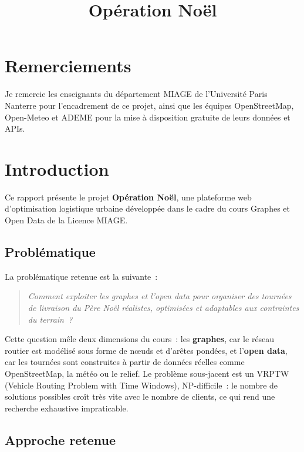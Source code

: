\documentclass[a4paper, 12pt, twoside]{article}
\title{Op\'{e}ration No\"{e}l}
\begin{document}
\pagedegarde

\section*{Remerciements}
Je remercie les enseignants du d\'{e}partement MIAGE de l'Universit\'{e} Paris Nanterre pour
l'encadrement de ce projet, ainsi que les \'{e}quipes OpenStreetMap, Open-Meteo et ADEME pour la
mise \`{a} disposition gratuite de leurs donn\'{e}es et APIs.

\newpage
\tableofcontents
\newpage

\section{Introduction}

Ce rapport pr\'{e}sente le projet \textbf{Op\'{e}ration No\"{e}l}, une plateforme web d'optimisation
logistique urbaine d\'{e}velopp\'{e}e dans le cadre du cours Graphes et Open Data de la Licence MIAGE.

\subsection{Probl\'{e}matique}

La probl\'{e}matique retenue est la suivante~:
\begin{quote}
\emph{Comment exploiter les graphes et l'open data pour organiser des tourn\'{e}es de livraison
du P\`{e}re No\"{e}l r\'{e}alistes, optimis\'{e}es et adaptables aux contraintes du terrain~?}
\end{quote}

Cette question m\^{e}le deux dimensions du cours~: les \textbf{graphes}, car le r\'{e}seau routier
est mod\'{e}lis\'{e} sous forme de n\oe uds et d'ar\^{e}tes pond\'{e}es, et l'\textbf{open data},
car les tourn\'{e}es sont construites \`{a} partir de donn\'{e}es r\'{e}elles comme OpenStreetMap,
la m\'{e}t\'{e}o ou le relief. Le probl\`{e}me sous-jacent est un VRPTW (Vehicle Routing Problem
with Time Windows), NP-difficile~: le nombre de solutions possibles cro\^{i}t tr\`{e}s vite avec
le nombre de clients, ce qui rend une recherche exhaustive impraticable.

\subsection{Approche retenue}
\end{document}
